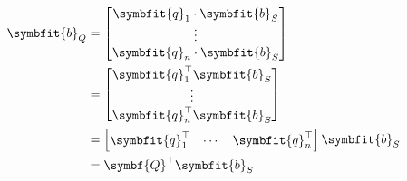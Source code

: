 \documentclass{article}
\begin{document}
\begin{align*}
    \symbfit{b}_Q & = \begin{bmatrix}
                          \symbfit{q}_1 \cdot \symbfit{b}_S \\
                          \vdots                            \\
                          \symbfit{q}_n \cdot \symbfit{b}_S
                      \end{bmatrix}                \\
                  & = \begin{bmatrix}
                          \symbfit{q}_1^\top \symbfit{b}_S \\
                          \vdots                           \\
                          \symbfit{q}_n^\top \symbfit{b}_S
                      \end{bmatrix}                 \\
                  & = \begin{bmatrix}
                          \symbfit{q}_1^\top & \cdots & \symbfit{q}_n^\top
                      \end{bmatrix} \symbfit{b}_S \\
                  & = \symbf{Q}^\top \symbfit{b}_S
\end{align*}
\end{document}

